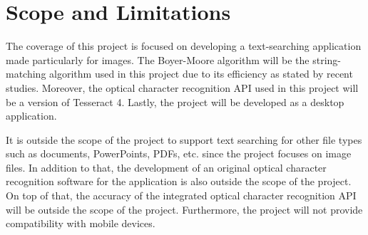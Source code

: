 \part{Scope and Limitations}


\hspace\parindent
The coverage of this project is focused on developing a text-searching application made particularly for images. The Boyer-Moore algorithm will be the string-matching algorithm used in this project due to its efficiency as stated by recent studies. Moreover, the optical character recognition API used in this project will be a version of Tesseract 4. Lastly, the project will be developed as a desktop application.

\hfill

It is outside the scope of the project to support text searching for other file types such as documents, PowerPoints, PDFs, etc. since the project focuses on image files. In addition to that, the development of an original optical character recognition software for the application is also outside the scope of the project. On top of that, the accuracy of the integrated optical character recognition API will be outside the scope of the project. Furthermore, the project will not provide compatibility with mobile devices.
